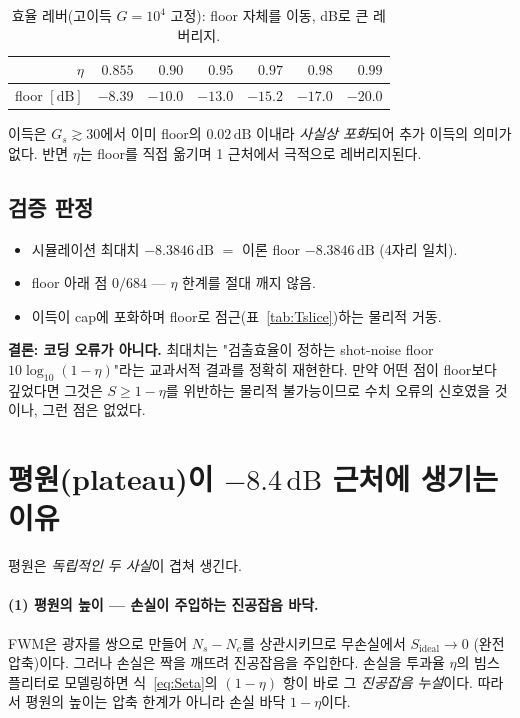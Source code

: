 \documentclass[11pt,a4paper]{article}
\newcommand{\dB}{\,\mathrm{dB}}
\begin{document}
\begin{table}[h]
\centering
\caption{효율 레버(고이득 $G=10^4$ 고정): floor 자체를 이동, dB로 큰 레버리지.}
\label{tab:eta}
\begin{tabular}{rrrrrrr}
\toprule
$\eta$ & $0.855$ & $0.90$ & $0.95$ & $0.97$ & $0.98$ & $0.99$\\
\midrule
floor $[\mathrm{dB}]$ & $-8.39$ & $-10.0$ & $-13.0$ & $-15.2$ & $-17.0$ & $-20.0$\\
\bottomrule
\end{tabular}
\end{table}

이득은 $G_s\gtrsim 30$에서 이미 floor의 $0.02\dB$ 이내라 \emph{사실상 포화}되어 추가 이득의
의미가 없다. 반면 $\eta$는 floor를 직접 옮기며 1 근처에서 극적으로 레버리지된다.

\subsection{검증 판정}
\begin{itemize}[nosep]
\item 시뮬레이션 최대치 $-8.3846\dB$ $=$ 이론 floor $-8.3846\dB$ (4자리 일치).
\item floor 아래 점 $0/684$ --- $\eta$ 한계를 절대 깨지 않음.
\item 이득이 cap에 포화하며 floor로 점근(표~\ref{tab:Tslice})하는 물리적 거동.
\end{itemize}
\textbf{결론: 코딩 오류가 아니다.} 최대치는 "검출효율이 정하는 shot-noise floor
$10\log_{10}(1-\eta)$"라는 교과서적 결과를 정확히 재현한다. 만약 어떤 점이 floor보다
깊었다면 그것은 $S\ge 1-\eta$를 위반하는 물리적 불가능이므로 수치 오류의 신호였을 것이나,
그런 점은 없었다.

\section{평원(plateau)이 $-8.4\dB$ 근처에 생기는 이유}
평원은 \emph{독립적인 두 사실}이 겹쳐 생긴다.

\paragraph{(1) 평원의 높이 --- 손실이 주입하는 진공잡음 바닥.}
FWM은 광자를 쌍으로 만들어 $N_s-N_c$를 상관시키므로 무손실에서 $S_{\mathrm{ideal}}\to 0$
(완전 압축)이다. 그러나 손실은 짝을 깨뜨려 진공잡음을 주입한다. 손실을 투과율 $\eta$의
빔스플리터로 모델링하면 식~\eqref{eq:Seta}의 $(1-\eta)$ 항이 바로 그 \emph{진공잡음
누설}이다. 따라서 평원의 높이는 압축 한계가 아니라 손실 바닥 $1-\eta$이다.
\end{document}
